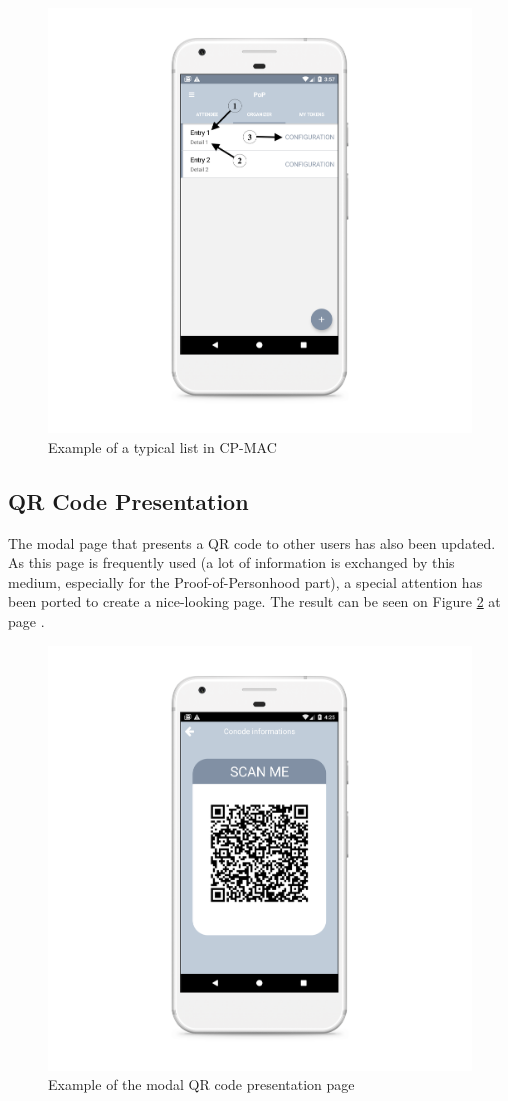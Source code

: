 \begin{figure}[!ht]
	\centering
	\includegraphics[height=0.8\linewidth]{resources/list_ui.png}
	\caption{Example of a typical list in CP-MAC}
	\label{fig:list_ui}
\end{figure}

\subsection{QR Code Presentation}
The modal page that presents a QR code to other users has also been updated. As this page is frequently used (a lot of information is exchanged by this medium, especially for the Proof-of-Personhood part), a special attention has been ported to create a nice-looking page. The result can be seen on Figure \ref{fig:qrcode_ui} at page \pageref{fig:qrcode_ui}.

\begin{figure}[!ht]
	\centering
	\includegraphics[height=0.8\linewidth]{resources/qrcode_ui.png}
	\caption{Example of the modal QR code presentation page}
	\label{fig:qrcode_ui}
\end{figure}